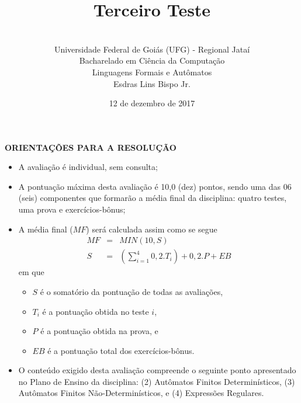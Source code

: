 \documentclass[12pt,a4paper,oneside]{article}
\author{\\Universidade Federal de Goiás (UFG) - Regional  Jataí\\Bacharelado em Ciência da Computação \\Linguagens Formais e Autômatos \\Esdras Lins Bispo Jr.}
\date{12 de dezembro de 2017}
\title{\sc \huge Terceiro Teste}
\begin{document}
\maketitle

{\bf ORIENTAÇÕES PARA A RESOLUÇÃO}

\small
 
\begin{itemize}
	\item A avaliação é individual, sem consulta;
	\item A pontuação máxima desta avaliação é 10,0 (dez) pontos, sendo uma das 06 (seis) componentes que formarão a média final da disciplina: quatro testes, uma prova e exercícios-bônus;
	\item A média final ($MF$) será calculada assim como se segue
	\begin{eqnarray}
		MF & = & MIN(10, S) \nonumber \\
		S & = & (\sum_{i=1}^{4} 0,2.T_i ) + 0,2.P  + EB\nonumber
	\end{eqnarray}
	em que 
	\begin{itemize}
		\item $S$ é o somatório da pontuação de todas as avaliações,
		\item $T_i$ é a pontuação obtida no teste $i$,
		\item $P$ é a pontuação obtida na prova, e
		\item $EB$ é a pontuação total dos exercícios-bônus.
	\end{itemize}
	\item O conteúdo exigido desta avaliação compreende o seguinte ponto apresentado no Plano de Ensino da disciplina: (2) Autômatos Finitos Determinísticos, (3) Autômatos Finitos Não-Determinísticos, e (4) Expressões Regulares.
\end{itemize}

\begin{center}
\end{center}

\newpage
\end{document}
